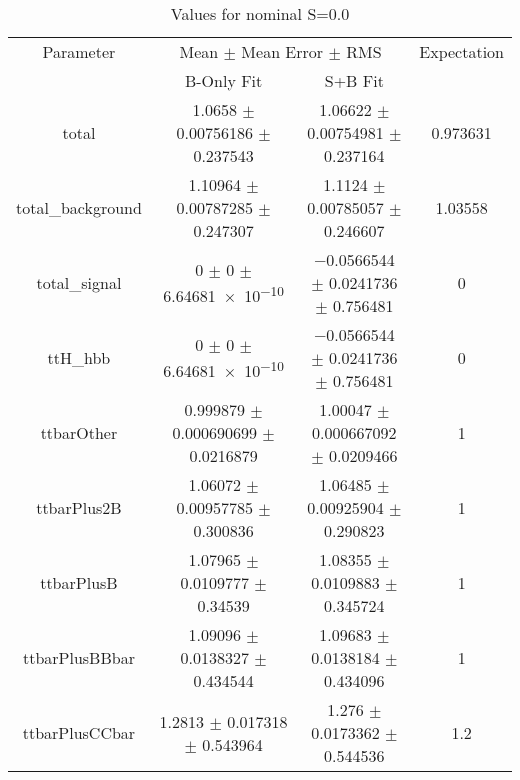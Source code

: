 \begin{table}
\centering
\caption{Values for nominal S=0.0}
\begin{tabular}{cccc}
\toprule
Parameter & \multicolumn{2}{c}{Mean $\pm$ Mean Error $\pm$ RMS} & Expectation\\
 & B-Only Fit & S+B Fit & \\
\midrule
total & \num{1.0658} $\pm$ \num{0.00756186} $\pm$ \num{0.237543} & \num{1.06622} $\pm$ \num{0.00754981} $\pm$ \num{0.237164} & \num{0.973631}\\
total\_background & \num{1.10964} $\pm$ \num{0.00787285} $\pm$ \num{0.247307} & \num{1.1124} $\pm$ \num{0.00785057} $\pm$ \num{0.246607} & \num{1.03558}\\
total\_signal & \num{0} $\pm$ \num{0} $\pm$ \num{6.64681e-10} & \num{-0.0566544} $\pm$ \num{0.0241736} $\pm$ \num{0.756481} & \num{0}\\
ttH\_hbb & \num{0} $\pm$ \num{0} $\pm$ \num{6.64681e-10} & \num{-0.0566544} $\pm$ \num{0.0241736} $\pm$ \num{0.756481} & \num{0}\\
ttbarOther & \num{0.999879} $\pm$ \num{0.000690699} $\pm$ \num{0.0216879} & \num{1.00047} $\pm$ \num{0.000667092} $\pm$ \num{0.0209466} & \num{1}\\
ttbarPlus2B & \num{1.06072} $\pm$ \num{0.00957785} $\pm$ \num{0.300836} & \num{1.06485} $\pm$ \num{0.00925904} $\pm$ \num{0.290823} & \num{1}\\
ttbarPlusB & \num{1.07965} $\pm$ \num{0.0109777} $\pm$ \num{0.34539} & \num{1.08355} $\pm$ \num{0.0109883} $\pm$ \num{0.345724} & \num{1}\\
ttbarPlusBBbar & \num{1.09096} $\pm$ \num{0.0138327} $\pm$ \num{0.434544} & \num{1.09683} $\pm$ \num{0.0138184} $\pm$ \num{0.434096} & \num{1}\\
ttbarPlusCCbar & \num{1.2813} $\pm$ \num{0.017318} $\pm$ \num{0.543964} & \num{1.276} $\pm$ \num{0.0173362} $\pm$ \num{0.544536} & \num{1.2}\\
\bottomrule
\end{tabular}
\end{table}